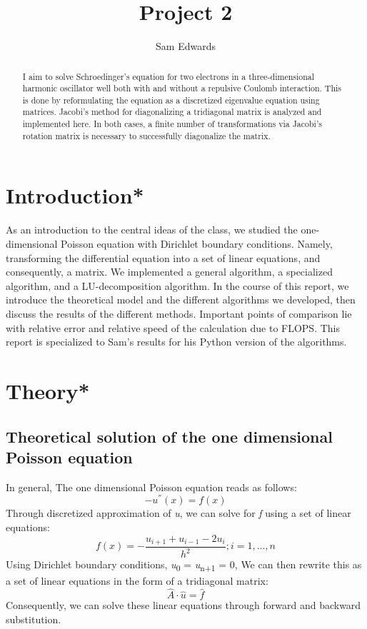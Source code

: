 \documentclass[10pt,showpacs,preprintnumbers,footinbib,amsmath,amssymb,aps,prl,twocolumn,groupedaddress,superscriptaddress,showkeys]{revtex4-1}
\begin{document}
\title{Project 2}
\author{Sam Edwards}
\begin{abstract}
I aim to solve Schroedinger's equation for two electrons in a three-dimensional harmonic oscillator well both with and without a repulsive Coulomb interaction. This is done by reformulating the equation as a discretized eigenvalue equation using matrices. Jacobi's method for diagonalizing a tridiagonal matrix is analyzed and implemented here. In both cases, a finite number of transformations via Jacobi's rotation matrix is necessary to successfully diagonalize the matrix.
\end{abstract}
\maketitle

\section{Introduction*}
As an introduction to the central ideas of the class, we studied the one-dimensional Poisson equation with Dirichlet boundary conditions. Namely, transforming the differential equation into a set of linear equations, and consequently, a matrix. We implemented a general algorithm, a specialized algorithm, and a LU-decomposition algorithm. In the course of this report, we introduce the theoretical model and the different algorithms  we developed, then discuss the results of the different methods. Important points of comparison lie with relative error and relative speed of the calculation due to FLOPS. This report is specialized to Sam's results for his Python version of the algorithms.

\section{Theory*}
	\subsection{Theoretical solution of the one dimensional Poisson equation}	
In general, The one dimensional Poisson equation reads as follows: \begin{equation} -u^{''}(x) = f(x)     \end{equation}  Through discretized approximation of {\it u}, we can solve for {\it f} using a set of linear equations: \begin{equation}
	f(x)=-\frac{u_{i+1}+u_{i-1}-2u_{i}}{h^{2}}      ;      i=1,...,n
	\end{equation}
Using Dirichlet boundary conditions, {\it u}\textsubscript{0} = {\it u}\textsubscript{n+1} = 0,  We can then rewrite this as a set of linear equations in the form of a tridiagonal matrix: \begin{equation}	
	\hat{A} \cdot \hat{u} = \hat{f}
	\end{equation}
Consequently, we can solve these linear equations through forward and backward substitution.
\end{document}
